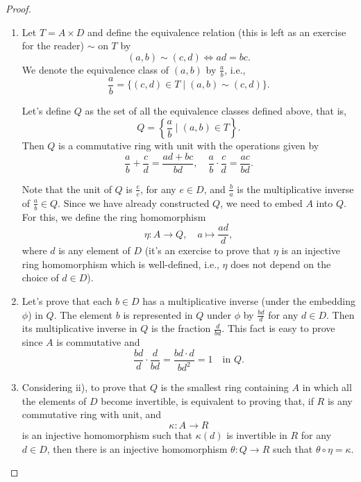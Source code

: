 \documentclass[11pt,a4paper]{article}
\begin{document}
\begin{proof}
    \begin{enumerate}[label=(\roman*)]
        \item Let $T = A \times D$ and define the equivalence relation (this is left as an exercise for the reader) $\sim$ on $T$ by
        \[
        (a, b) \sim (c, d) \iff ad = bc.
        \]
        We denote the equivalence class of $(a, b)$ by $\frac{a}{b}$, i.e.,
        \[
        \frac{a}{b} = \{(c, d) \in T \mid (a, b) \sim (c, d)\}.
        \]
    
        Let's define $Q$ as the set of all the equivalence classes defined above, that is,
        \[
        Q = \left\{\frac{a}{b} \mid (a, b) \in T \right\}.
        \]
        Then $Q$ is a commutative ring with unit with the operations given by
        \[
        \frac{a}{b} + \frac{c}{d} = \frac{ad + bc}{bd}, \quad \frac{a}{b} \cdot \frac{c}{d} = \frac{ac}{bd}.
        \]
    
        Note that the unit of $Q$ is $\frac{e}{e}$, for any $e \in D$, and $\frac{b}{a}$ is the multiplicative inverse of $\frac{a}{b} \in Q$. Since we have already constructed $Q$, we need to embed $A$ into $Q$. For this, we define the ring homomorphism
        \[
        \eta : A \to Q, \quad a \mapsto \frac{ad}{d},
        \]
        where $d$ is any element of $D$ (it's an exercise to prove that $\eta$ is an injective ring homomorphism which is well-defined, i.e., $\eta$ does not depend on the choice of $d \in D$).
    
        \item Let's prove that each $b \in D$ has a multiplicative inverse (under the embedding $\phi$) in $Q$. The element $b$ is represented in $Q$ under $\phi$ by $\frac{bd}{d}$ for any $d \in D$. Then its multiplicative inverse in $Q$ is the fraction $\frac{d}{bd}$. This fact is easy to prove since $A$ is commutative and
        \[
        \frac{bd}{d} \cdot \frac{d}{bd} = \frac{bd \cdot d}{bd^2} = 1 \quad \text{in } Q.
        \]
    
        \item Considering ii), to prove that $Q$ is the smallest ring containing $A$ in which all the elements of $D$ become invertible, is equivalent to proving that, if $R$ is any commutative ring with unit, and
        \[
        \kappa : A \to R
        \]
        is an injective homomorphism such that $\kappa(d)$ is invertible in $R$ for any $d \in D$, then there is an injective homomorphism $\theta : Q \to R$ such that $\theta \circ \eta = \kappa$.
    

\end{enumerate}
\end{proof}
\end{document}

